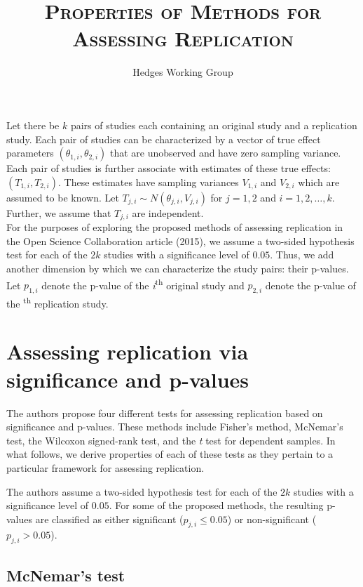\documentclass{article}
\title{\textsc{Properties of Methods for Assessing Replication}}
\author{Hedges Working Group}
\begin{document}
\maketitle



Let there be $k$ pairs of studies each containing an original study and a replication study. Each pair of studies can be characterized by a vector of true effect parameters $(\theta_{1,i}, \theta_{2,i})$ that are unobserved and have zero sampling variance. Each pair of studies is further associate with estimates of these true effects: $(T_{1,i}, T_{2,i})$. These estimates have sampling variances $V_{1,i}$ and $V_{2,i}$ which are assumed to be known. Let $T_{j,i} \sim N(\theta_{j,i}, V_{j,i})$ for $j = 1,2$ and $i=1,2,\ldots, k$. Further, we assume that $T_{j,i}$ are independent.
\\

For the purposes of exploring the proposed methods of assessing replication in the Open Science Collaboration article (2015), we assume a two-sided hypothesis test for each of the $2k$ studies with a significance level of $0.05$. Thus, we add another dimension by which we can characterize the study pairs: their p-values. Let $p_{1,i}$ denote the p-value of the \textit{i}\textsuperscript{th} original study and $p_{2,i}$ denote the p-value of the \textsuperscript{th} replication study.

\section{Assessing replication via significance and p-values}

The authors propose four different tests for assessing replication based on significance and p-values. These methods include Fisher's method, McNemar's test, the Wilcoxon signed-rank test, and the \textit{t} test for dependent samples. In what follows, we derive properties of each of these tests as they pertain to a particular framework for assessing replication.

The authors assume a two-sided hypothesis test for each of the $2k$ studies with a significance level of $0.05$. For some of the proposed methods, the resulting p-values are classified as either significant ($p_{j,i} \leq 0.05$) or non-significant ($p_{j,i} > 0.05$). 

\subsection{McNemar's test}
\end{document}
